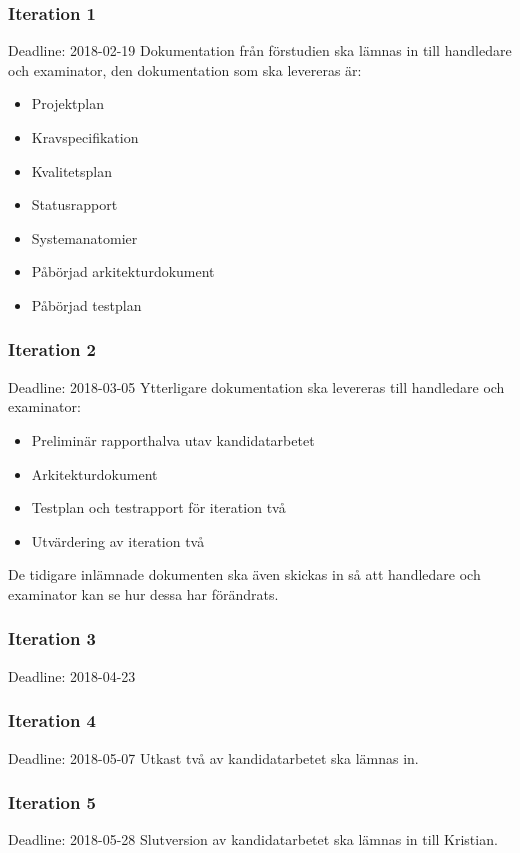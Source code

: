 \documentclass[a4paper,10pt, twoside]{article}
\begin{document}
\subsubsection{Iteration 1}
Deadline: 2018-02-19
Dokumentation från förstudien ska lämnas in till handledare och examinator, den dokumentation som ska levereras är:
\begin{itemize}
\item Projektplan
\item Kravspecifikation
\item Kvalitetsplan
\item Statusrapport
\item Systemanatomier
\item Påbörjad arkitekturdokument
\item Påbörjad testplan
\end{itemize}
\subsubsection{Iteration 2}
Deadline: 2018-03-05
Ytterligare dokumentation ska levereras till handledare och examinator:
\begin{itemize}
\item Preliminär rapporthalva utav kandidatarbetet
\item Arkitekturdokument
\item Testplan och testrapport för iteration två
\item Utvärdering av iteration två
\end{itemize}
De tidigare inlämnade dokumenten ska även skickas in så att handledare och examinator kan se hur dessa har förändrats.
\subsubsection{Iteration 3}
Deadline: 2018-04-23
\subsubsection{Iteration 4}
Deadline: 2018-05-07
Utkast två av kandidatarbetet ska lämnas in.
\subsubsection{Iteration 5}
Deadline: 2018-05-28
Slutversion av kandidatarbetet ska lämnas in till Kristian.
\end{document}
